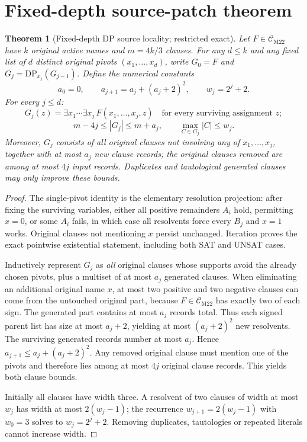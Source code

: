 \documentclass[11pt]{article}
\newtheorem{theorem}{Theorem}
\newcommand{\CM}{\mathcal C_{\mathrm{M22}}}
\begin{document}
\section{Fixed-depth source-patch theorem}
\begin{theorem}[Fixed-depth DP source locality; restricted exact]
Let $F\in\CM$ have $k$ original active names and $m=4k/3$ clauses. For any $d\le k$ and any fixed list of $d$ distinct original pivots $(x_1,\ldots,x_d)$, write $G_0=F$ and $G_j=\mathrm{DP}_{x_j}(G_{j-1})$. Define the numerical constants
\[
a_0=0,\qquad a_{j+1}=a_j+(a_j+2)^2,\qquad w_j=2^j+2.
\]
For every $j\le d$:
\[
\boxed{G_j(z)=\exists x_1\cdots\exists x_j\,F(x_1,\ldots,x_j,z)}
\quad\text{for every surviving assignment }z;
\]
\[
\boxed{m-4j\le |G_j|\le m+a_j,\qquad
\max_{C\in G_j}|C|\le w_j.}
\]
Moreover, $G_j$ consists of all original clauses not involving any of $x_1,\ldots,x_j$, together with at most $a_j$ new clause records; the original clauses removed are among at most $4j$ input records. Duplicates and tautological generated clauses may only improve these bounds.
\end{theorem}
\begin{proof}
The single-pivot identity is the elementary resolution projection: after fixing the surviving variables, either all positive remainders $A_i$ hold, permitting $x=0$, or some $A_i$ fails, in which case all resolvents force every $B_j$ and $x=1$ works. Original clauses not mentioning $x$ persist unchanged. Iteration proves the exact pointwise existential statement, including both SAT and UNSAT cases.

Inductively represent $G_j$ as \emph{all} original clauses whose supports avoid the already chosen pivots, plus a multiset of at most $a_j$ generated clauses. When eliminating an additional original name $x$, at most two positive and two negative clauses can come from the untouched original part, because $F\in\CM$ has exactly two of each sign. The generated part contains at most $a_j$ records total. Thus each signed parent list has size at most $a_j+2$, yielding at most $(a_j+2)^2$ new resolvents. The surviving generated records number at most $a_j$. Hence $a_{j+1}\le a_j+(a_j+2)^2$. Any removed original clause must mention one of the pivots and therefore lies among at most $4j$ original clause records. This yields both clause bounds.

Initially all clauses have width three. A resolvent of two clauses of width at most $w_j$ has width at most $2(w_j-1)$; the recurrence $w_{j+1}=2(w_j-1)$ with $w_0=3$ solves to $w_j=2^j+2$. Removing duplicates, tautologies or repeated literals cannot increase width.\end{proof}
\end{document}
